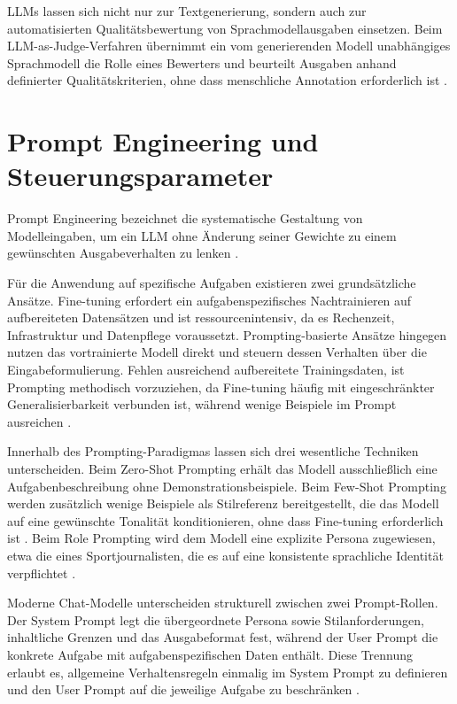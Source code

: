 LLMs lassen sich nicht nur zur Textgenerierung, sondern auch zur automatisierten Qualitätsbewertung von Sprachmodellausgaben einsetzen. Beim LLM-as-Judge-Verfahren übernimmt ein vom generierenden Modell unabhängiges Sprachmodell die Rolle eines Bewerters und beurteilt Ausgaben anhand definierter Qualitätskriterien, ohne dass menschliche Annotation erforderlich ist \cite{zheng2023}.



\section{Prompt Engineering und Steuerungsparameter}\label{prompt-engineering}

Prompt Engineering bezeichnet die systematische Gestaltung von Modelleingaben, um ein LLM ohne Änderung seiner Gewichte zu einem gewünschten Ausgabeverhalten zu lenken \cite{brown2020}.

Für die Anwendung auf spezifische Aufgaben existieren zwei grundsätzliche Ansätze. Fine-tuning erfordert ein aufgabenspezifisches Nachtrainieren auf aufbereiteten Datensätzen und ist ressourcenintensiv, da es Rechenzeit, Infrastruktur und Datenpflege voraussetzt. Prompting-basierte Ansätze hingegen nutzen das vortrainierte Modell direkt und steuern dessen Verhalten über die Eingabeformulierung. Fehlen ausreichend aufbereitete Trainingsdaten, ist Prompting methodisch vorzuziehen, da Fine-tuning häufig mit eingeschränkter Generalisierbarkeit verbunden ist, während wenige Beispiele im Prompt ausreichen \cite{brown2020}.

Innerhalb des Prompting-Paradigmas lassen sich drei wesentliche Techniken unterscheiden. Beim Zero-Shot Prompting erhält das Modell ausschließlich eine Aufgabenbeschreibung ohne Demonstrationsbeispiele. Beim Few-Shot Prompting werden zusätzlich wenige Beispiele als Stilreferenz bereitgestellt, die das Modell auf eine gewünschte Tonalität konditionieren, ohne dass Fine-tuning erforderlich ist \cite{brown2020}. Beim Role Prompting wird dem Modell eine explizite Persona zugewiesen, etwa die eines Sportjournalisten, die es auf eine konsistente sprachliche Identität verpflichtet \cite{openai2023}.

Moderne Chat-Modelle unterscheiden strukturell zwischen zwei Prompt-Rollen. Der System Prompt legt die übergeordnete Persona sowie Stilanforderungen, inhaltliche Grenzen und das Ausgabeformat fest, während der User Prompt die konkrete Aufgabe mit aufgabenspezifischen Daten enthält. Diese Trennung erlaubt es, allgemeine Verhaltensregeln einmalig im System Prompt zu definieren und den User Prompt auf die jeweilige Aufgabe zu beschränken \cite{openai2023}.

